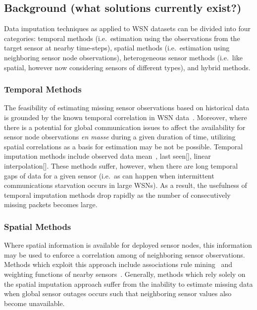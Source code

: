 \subsection{Background (what solutions currently exist?)}
Data imputation techniques as applied to WSN datasets can be divided into four categories:
temporal methods (i.e.\ estimation using the observations from the target sensor at nearby time-steps),
spatial methods (i.e.\ estimation using neighboring sensor node observations),
heterogeneous sensor methods (i.e.\ like spatial, however now considering sensors of different types),
and hybrid methods.

\subsubsection{Temporal Methods}
The feasibility of estimating missing sensor observations based on historical data is grounded by the known temporal correlation in WSN data~\cite{akyildiz2004exploiting}.
Moreover, where there is a potential for global communication issues to affect the availability for sensor node observations \emph{en masse} during a given duration of time, utilizing spatial correlations as a basis for estimation may be not be possible.
Temporal imputation methods include observed data mean~\cite{madden2005tinydb,setz2009combining}, last seen[], linear interpolation[].
These methods suffer, however, when there are long temporal gaps of data for a given sensor (i.e.\ as can happen when intermittent communications starvation occurs in large WSNs).
As a result, the usefulness of temporal imputation methods drop rapidly as the number of consecutively missing packets becomes large.

\subsubsection{Spatial Methods}
Where spatial information is available for deployed sensor nodes, this information may be used to enforce a correlation among of neighboring sensor observations.
Methods which exploit this approach include associations rule mining~\cite{le2005estimating,jiang2007estimating} and weighting functions of nearby sensors~\cite{li2008spatial,li2008data,pan2010k}.
Generally, methods which rely solely on the spatial imputation approach suffer from the inability to estimate missing data when global sensor outages occurs such that neighboring sensor values also become unavailable.

